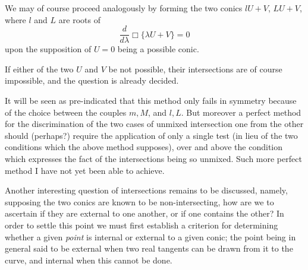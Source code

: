 \documentclass[11pt]{article}
\begin{document}
{{We may of course proceed analogously by forming the two conics $lU+V$, $LU+V$, where $l$ and $L$ are roots of
\[
\frac{d}{d\lambda}\Box\{\lambda U+V\}=0
\]
upon the supposition of $U=0$ being a possible conic.

If either of the two $U$ and $V$ be not possible, their intersections are of course impossible, and the question is already decided.

It will be seen as pre-indicated that this method only fails in symmetry because of the choice between the couples $m,M$, and $l,L$. But moreover a perfect method for the discrimination of the two cases of unmixed intersection one from the other should (perhaps?) require the application of only a single test (in lieu of the two conditions which the above method supposes), over and above the condition which expresses the fact of the intersections being so unmixed. Such more perfect method I have not yet been able to achieve.

Another interesting question of intersections remains to be discussed, namely, supposing the two conics are known to be non-intersecting, how are we to ascertain if they are external to one another, or if one contains the other? In order to settle this point we must first establish a criterion for determining whether a given \emph{point} is internal or external to a given conic; the point being in general said to be external when two real tangents can be drawn from it to the curve, and internal when this cannot be done.

}}
\end{document}
